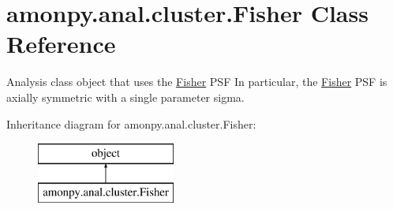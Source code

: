 \hypertarget{classamonpy_1_1anal_1_1cluster_1_1_fisher}{\section{amonpy.\-anal.\-cluster.\-Fisher Class Reference}
\label{classamonpy_1_1anal_1_1cluster_1_1_fisher}
}


Analysis class object that uses the \hyperlink{classamonpy_1_1anal_1_1cluster_1_1_fisher}{Fisher} P\-S\-F In particular, the \hyperlink{classamonpy_1_1anal_1_1cluster_1_1_fisher}{Fisher} P\-S\-F is axially symmetric with a single parameter sigma.  


Inheritance diagram for amonpy.\-anal.\-cluster.\-Fisher\-:\begin{figure}[H]
\begin{center}
\leavevmode
\includegraphics[height=2.000000cm]{df/d03/classamonpy_1_1anal_1_1cluster_1_1_fisher}
\end{center}
\end{figure}
